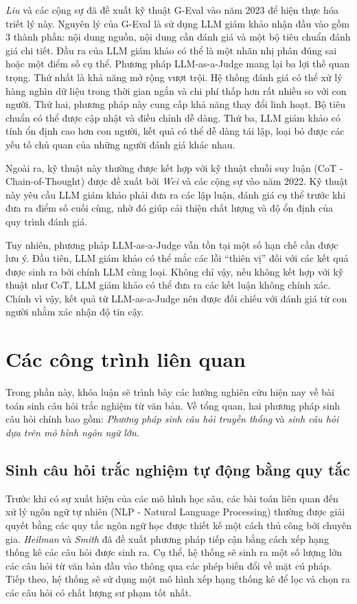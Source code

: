\textit{Liu} và các cộng sự đã đề xuất kỹ thuật G-Eval \cite{liu2023geval} vào năm 2023 để hiện thực hóa triết lý này. Nguyên lý của G-Eval là sử dụng LLM giám khảo nhận đầu vào gồm 3 thành phần: nội dung nguồn, nội dung cần đánh giá và một bộ tiêu chuẩn đánh giá chi tiết. Đầu ra của LLM giám khảo có thể là một nhãn nhị phân đúng sai hoặc một điểm số cụ thể. Phương pháp LLM-as-a-Judge mang lại ba lợi thế quan trọng. Thứ nhất là khả năng mở rộng vượt trội. Hệ thống đánh giá có thể xử lý hàng nghìn dữ liệu trong thời gian ngắn và chi phí thấp hơn rất nhiều so với con người. Thứ hai, phương pháp này cung cấp khả năng thay đổi linh hoạt. Bộ tiêu chuẩn có thể được cập nhật và điều chỉnh dễ dàng. Thứ ba, LLM giám khảo có tính ổn định cao hơn con người, kết quả có thể dễ dàng tái lập, loại bỏ được các yếu tố chủ quan của những người đánh giá khác nhau.

Ngoài ra, kỹ thuật này thường được kết hợp với kỹ thuật chuỗi suy luận (CoT - Chain-of-Thought) \cite{wei2022chain} được đề xuất bởi \textit{Wei} và các cộng sự vào năm 2022. Kỹ thuật này yêu cầu LLM giám khảo phải đưa ra các lập luận, đánh giá cụ thể trước khi đưa ra điểm số cuối cùng, nhờ đó giúp cải thiện chất lượng và độ ổn định của quy trình đánh giá.

Tuy nhiên, phương pháp LLM-as-a-Judge vẫn tồn tại một số hạn chế cần được lưu ý. Đầu tiên, LLM giám khảo có thể mắc các lỗi ``thiên vị'' đối với các kết quả được sinh ra bởi chính LLM cùng loại. Không chỉ vậy, nếu không kết hợp với kỹ thuật như CoT, LLM giám khảo có thể đưa ra các kết luận không chính xác. Chính vì vậy, kết quả từ LLM-as-a-Judge nên được đối chiếu với đánh giá từ con người nhằm xác nhận độ tin cậy.

\section{Các công trình liên quan}

Trong phần này, khóa luận sẽ trình bày các hướng nghiên cứu hiện nay về bài toán sinh câu hỏi trắc nghiệm từ văn bản. Về tổng quan, hai phương pháp sinh câu hỏi chính bao gồm: \textit{Phương pháp sinh câu hỏi truyền thống} và \textit{sinh câu hỏi dựa trên mô hình ngôn ngữ lớn}.

\subsection{Sinh câu hỏi trắc nghiệm tự động bằng quy tắc}

Trước khi có sự xuất hiện của các mô hình học sâu, các bài toán liên quan đến xử lý ngôn ngữ tự nhiên (NLP - Natural Language Processing) thường được giải quyết bằng các quy tắc ngôn ngữ học được thiết kế một cách thủ công bởi chuyên gia. \textit{Heilman} và \textit{Smith} \cite{heilman2010good} đã đề xuất phương pháp tiếp cận bằng cách xếp hạng thống kê các câu hỏi được sinh ra. Cụ thể, hệ thống sẽ sinh ra một số lượng lớn các câu hỏi từ văn bản đầu vào thông qua các phép biến đổi về mặt cú pháp. Tiếp theo, hệ thống sẽ sử dụng một mô hình xếp hạng thống kê để lọc và chọn ra các câu hỏi có chất lượng sư phạm tốt nhất.


